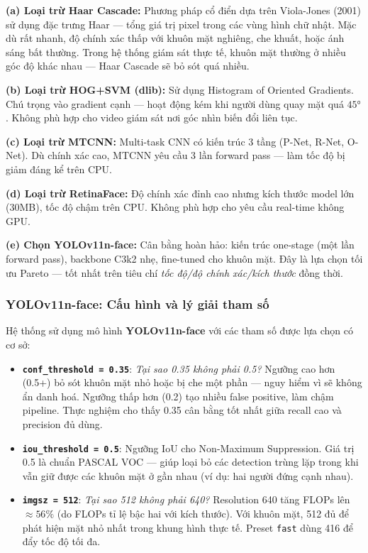\textbf{(a) Loại trừ Haar Cascade:} Phương pháp cổ điển dựa trên Viola-Jones (2001) sử dụng đặc trưng Haar — tổng giá trị pixel trong các vùng hình chữ nhật. Mặc dù rất nhanh, độ chính xác thấp với khuôn mặt nghiêng, che khuất, hoặc ánh sáng bất thường. Trong hệ thống giám sát thực tế, khuôn mặt thường ở nhiều góc độ khác nhau — Haar Cascade sẽ bỏ sót quá nhiều.

\textbf{(b) Loại trừ HOG+SVM (dlib):} Sử dụng Histogram of Oriented Gradients. Chú trọng vào gradient cạnh — hoạt động kém khi người dùng quay mặt quá $45°$. Không phù hợp cho video giám sát nơi góc nhìn biến đổi liên tục.

\textbf{(c) Loại trừ MTCNN:} Multi-task CNN có kiến trúc 3 tầng (P-Net, R-Net, O-Net). Dù chính xác cao, MTCNN yêu cầu 3 lần forward pass --- làm tốc độ bị giảm đáng kể trên CPU.

\textbf{(d) Loại trừ RetinaFace:} Độ chính xác đỉnh cao nhưng kích thước model lớn (30MB), tốc độ chậm trên CPU. Không phù hợp cho yêu cầu real-time không GPU.

\textbf{(e) Chọn YOLOv11n-face:} Cân bằng hoàn hảo: kiến trúc one-stage (một lần forward pass), backbone C3k2 nhẹ, fine-tuned cho khuôn mặt. Đây là lựa chọn tối ưu Pareto --- tốt nhất trên tiêu chí \textit{tốc độ/độ chính xác/kích thước} đồng thời.

\subsubsection{YOLOv11n-face: Cấu hình và lý giải tham số}
\label{subsubsec:yolov11face}

Hệ thống sử dụng mô hình \textbf{YOLOv11n-face} với các tham số được lựa chọn có cơ sở:

\begin{itemize}
    \item \textbf{\texttt{conf\_threshold = 0.35}}: \textit{Tại sao 0.35 không phải 0.5?} Ngưỡng cao hơn (0.5+) bỏ sót khuôn mặt nhỏ hoặc bị che một phần --- nguy hiểm vì sẽ không ẩn danh hoá. Ngưỡng thấp hơn (0.2) tạo nhiều false positive, làm chậm pipeline. Thực nghiệm cho thấy 0.35 cân bằng tốt nhất giữa recall cao và precision đủ dùng.
    
    \item \textbf{\texttt{iou\_threshold = 0.5}}: Ngưỡng IoU cho Non-Maximum Suppression. Giá trị 0.5 là chuẩn PASCAL VOC --- giúp loại bỏ các detection trùng lặp trong khi vẫn giữ được các khuôn mặt ở gần nhau (ví dụ: hai người đứng cạnh nhau).
    
    \item \textbf{\texttt{imgsz = 512}}: \textit{Tại sao 512 không phải 640?} Resolution 640 tăng FLOPs lên $\approx 56\%$ (do FLOPs tỉ lệ bậc hai với kích thước). Với khuôn mặt, 512 đủ để phát hiện mặt nhỏ nhất trong khung hình thực tế. Preset \texttt{fast} dùng 416 để đẩy tốc độ tối đa.
\end{itemize}

